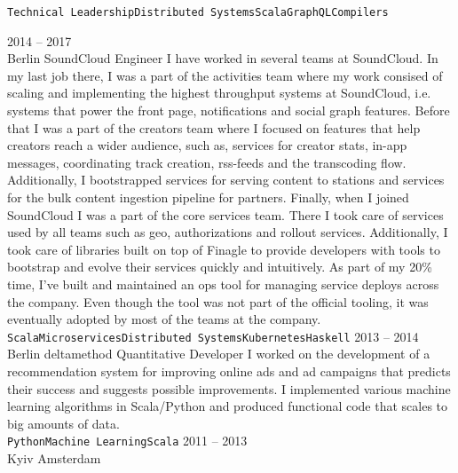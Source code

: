 \documentclass[9pt]{developercv} %
\begin{document}
\begin{entrylist}
{\begin{itemize}
			\end{itemize}
			\texttt{Technical Leadership}\slashsep\texttt{Distributed Systems}\slashsep\texttt{Scala}\slashsep\texttt{GraphQL}\slashsep\texttt{Compilers}
		}
	\entry
		{2014 -- 2017\\\footnotesize{Berlin}}
		{SoundCloud}
		{Engineer}
		{
			I have worked in several teams at SoundCloud. In my last job there, I was a part of the activities team where my work consised of scaling and implementing the highest throughput systems at SoundCloud, i.e. systems that power the front page, notifications and social graph features.\newline\newline
			Before that I was a part of the creators team where I focused on features that help creators reach a wider audience, such as, services for creator stats, in-app messages, coordinating track creation, rss-feeds and the transcoding flow. Additionally, I bootstrapped services for serving content to stations and services for the bulk content ingestion pipeline for partners.\newline\newline
			Finally, when I joined SoundCloud I was a part of the core services team. There I took care of services used by all teams such as geo, authorizations and rollout services. Additionally, I took care of libraries built on top of Finagle to provide developers with tools to bootstrap and evolve their services quickly and intuitively.\newline\newline
			As part of my 20\% time, I've built and maintained an ops tool for managing service deploys across the company. Even though the tool was not part of the official tooling, it was eventually adopted by most of the teams at the company.\\
			\texttt{Scala}\slashsep\texttt{Microservices}\slashsep\texttt{Distributed Systems}\slashsep\texttt{Kubernetes}\slashsep\texttt{Haskell}}
	\entry
		{2013 -- 2014\\\footnotesize{Berlin}}
		{deltamethod}
		{Quantitative Developer}
		{
			I worked on the development of a recommendation system for improving online ads and ad campaigns that predicts their success and suggests possible improvements. I implemented various machine learning algorithms in Scala/Python and produced functional code that scales to big amounts of data.
			\\ \texttt{Python}\slashsep\texttt{Machine Learning}\slashsep\texttt{Scala}
		}
	\entry
		{2011 -- 2013\\\footnotesize{Kyiv \newline Amsterdam}}

\end{entrylist}
\end{document}
